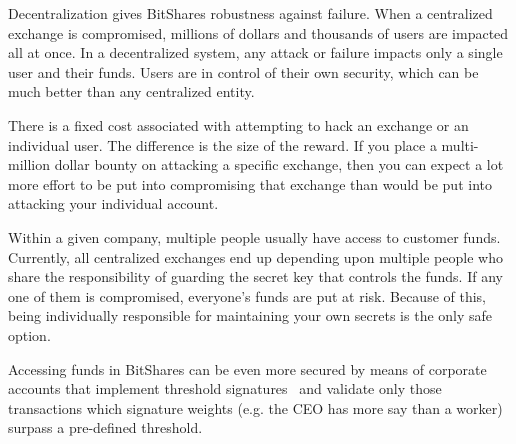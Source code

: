 Decentralization gives BitShares robustness against failure. When a
centralized exchange is compromised, millions of dollars and thousands of users
are impacted all at once. In a decentralized system, any attack or failure
impacts only a single user and their funds. Users are in control of their own
security, which can be much better than any centralized entity.

There is a fixed cost associated with attempting to hack an exchange or an
individual user. The difference is the size of the reward. If you place a
multi-million dollar bounty on attacking a specific exchange, then you can
expect a lot more effort to be put into compromising that exchange than would
be put into attacking your individual account.

Within a given company, multiple people usually have access to customer funds.
%
%
Currently, all centralized exchanges end up depending upon multiple people who
share the responsibility of guarding the secret key that controls the funds.
If any one of them is compromised, everyone's funds are put at risk. Because of
this, being individually responsible for maintaining your own secrets is the
only safe option.

Accessing funds in BitShares can be even more secured by means of corporate
accounts that implement threshold signatures~\cite{bts:general,ripple:multisig}
and validate only those transactions which signature weights (e.g. the CEO has
more say than a worker) surpass a pre-defined threshold.
